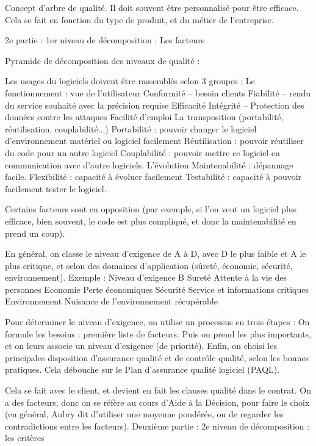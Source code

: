 Concept d'arbre de qualité. Il doit souvent être personnalisé pour être efficace. Cela se fait en fonction du type de produit, et du métier de l’entreprise.



	 	 	 	

2e partie : 1er niveau de décomposition : Les facteurs

	 	 	 	
Pyramide de décomposition des niveaux de qualité :


Les usages du logiciels doivent être rassemblés selon 3 groupes :
Le fonctionnement : vue de l'utilisateur	
Conformité – besoin clients
Fiabilité – rendu du service souhaité avec la précision requise
Efficacité
Intégrité – Protection des données contre les attaques
Facilité d'emploi
La transposition (portabilité, 	réutilisation, couplabilité...)
Portabilité : pouvoir changer le logiciel d'environnement matériel ou logiciel facilement
Réutilisation : pouvoir	réutiliser du code pour un autre logiciel
Couplabilité : pouvoir mettre ce logiciel en communication avec d'autre logiciels.
L'évolution
Maintenabilité : dépannage facile.
Flexibilité : capacité à 	évoluer facilement
Testabilité : capacité à pouvoir facilement tester le logiciel.

	 	 	 	
Certains facteurs sont en opposition (par exemple, si l'on veut un logiciel plus efficace, bien souvent, le code est plus compliqué, et donc la maintenabilité en prend un coup).

En général, on classe le niveau d'exigence de A à D, avec D le plus faible et A le plus critique, et selon des domaines d'application (sûreté, économie, sécurité, environnement).
Exemple : Niveau d'exigence B 
Sureté	
Attente à la vie des personnes
Economie
Perte économiques
Sécurité
Service et informations critiques
Environnement
Nuisance de l'environnement récupérable


Pour déterminer le niveau d'exigence, on utilise un processus en trois étapes :
On formule les besoins : première liste de facteurs. Puis on prend les plus importants, et on leurs associe un niveau d'exigence (de priorité). Enfin, on choisi les principales disposition d'assurance qualité et de contrôle qualité, selon les bonnes pratiques.
Cela débouche sur le Plan d'assurance qualité logiciel (PAQL).

Cela se fait avec le client, et devient en fait les clauses qualité dans le contrat. On a des facteurs, donc on se réfère au cours d'Aide à la Décision, pour faire le choix (en général, Aubry dit d'utiliser une moyenne pondérée, ou de regarder les contradictions entre les facteurs).
Deuxième partie : 2e niveau de décomposition : les critères

